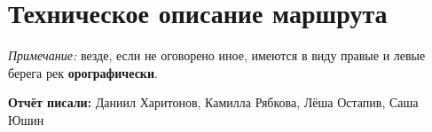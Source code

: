 \section{Техническое описание маршрута}
\textit{Примечание:} везде, если не оговорено иное, имеются в виду правые и левые берега рек \textbf{орографически}.

\textbf{Отчёт писали:} Даниил Харитонов, Камилла Рябкова, Лёша Остапив, Саша Юшин







